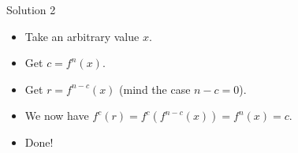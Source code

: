 \begin{frame}
    \frametitle{\problemtitle}
	\begin{block}{Solution 2}
		\begin{itemize}
			\item Take an arbitrary value $x$.
			\item Get $c = f^n(x)$.
			\item Get $r = f^{n-c}(x)$ (mind the case $n-c = 0$).
			\item We now have $f^c(r) = f^c(f^{n-c}(x)) = f^n(x) = c$.
			\item Done!
		\end{itemize}
	\end{block}
    \pause
    \solvestats
\end{frame}
